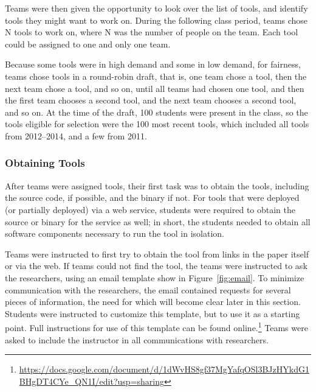 \documentclass[10pt,conference]{IEEEtran}
\begin{document}
Teams were then given the opportunity to look over the list of
tools, and identify tools they might want to work on.
During the following class period, teams chose N tools to work on,
where N was the number of people on the team.
Each tool could be assigned to one and only one team.

Because some tools were in high demand and some in low demand, for fairness,
teams chose tools in a round-robin draft,
that is, one team chose a tool, then the next team chose a tool, and so on,
until all teams had chosen one tool, and then the first team chooses a second
tool, and the next team chooses a second tool, and so on.
At the time of the draft, 100 students were present in the class, so the tools eligible
for selection were the 100 most recent tools, which included all tools
from 2012--2014, and a few from 2011.

\subsubsection{Obtaining Tools}

After teams were assigned tools, their first task was to 
obtain the tools, including the source code, if possible,
and the binary if not.
For tools that were deployed (or partially deployed) via a web service, 
students were required to obtain the source or binary for
the service as well; in short, the students needed to
obtain all software components necessary to run the tool
in isolation. 

Teams were instructed to first try to 
obtain the tool from links in the paper itself or via
the web.
If teams could not find the tool, the teams
were instructed to ask the researchers, using an email
template show in Figure~\ref{fig:email}.
To minimize communication with the researchers, 
the email contained requests for several
pieces of information, the need for which will become 
clear later in this section.
Students were instructed to customize this template,
but to use it as a starting point. 
Full instructions for use of this template can be found 
online.\footnote{\url{https://docs.google.com/document/d/1dWvHS8gf37MgYafqOSl3BJzHYkdG1BHgDT4CYe_QN1I/edit?usp=sharing}}
Teams were asked to include the instructor in
all communications with researchers.
\end{document}
